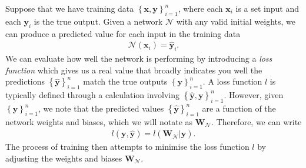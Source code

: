 \documentclass{somasmsc}
\begin{document}
Suppose that we have training data $\left\{\pmb{x}, \pmb{y}\right\}_{i=1}^n$, where each $\pmb{x}_i$ is a set input and each $\pmb{y}_i$ is the true output. Given a network $\mathcal{N}$ with any valid initial weights, we can produce a predicted value for each input in the training data
\begin{align*}
\mathcal{N}\left(\pmb{x}_i\right) = \hat{\pmb{y}}_i.
\end{align*}
We can evaluate how well the network is performing by introducing a \textit{loss function} which gives us a real value that broadly indicates you well the predictions $\left\{\hat{\pmb{y}}\right\}_{i=1}^n$ match the true outputs $\left\{\pmb{y}\right\}_{i=1}^n$. A loss function $l$ is typically defined through a calculation involving $\left\{\hat{\pmb{y}}, \pmb{y}\right\}_{i=1}^n$. However, given $\left\{\pmb{y}\right\}_{i=1}^n$, we note that the predicted values $\left\{\hat{\pmb{y}}\right\}_{i=1}^n$ are a function of the network weights and biases, which we will notate as $\mathbf{W}_{\mathcal{N}}$. Therefore, we can write
\begin{align*}
l\left(\pmb{y}, \hat{\pmb{y}}\right) = l\left(\mathbf{W}_{\mathcal{N}} | \pmb{y}\right).
\end{align*}
The process of training then attempts to minimise the loss function $l$ by adjusting the weights and biases $\mathbf{W}_{\mathcal{N}}$.
\end{document}
